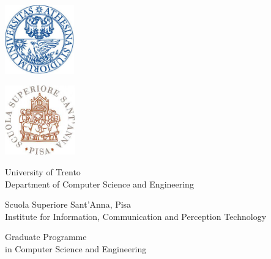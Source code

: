 \documentclass[11pt,a4paper,twoside,titlepage,openany]{book}
\begin{document}
\begin{titlepage}

  \begin{center}
    \noindent\begin{minipage}{.65\textwidth} 
      \begin{minipage}{0.5\textwidth}
        \centering
        \includegraphics[height=3cm]{img/logo_unitn_blu.jpg}  %
      \end{minipage}%
      \begin{minipage}{0.5\textwidth}
        \centering 
        \includegraphics[height=3cm]{img/logo_santanna.jpg}
      \end{minipage} 
    \end{minipage}
    \vspace{1cm}

    \LARGE{University of Trento}\\
    \Large{Department of Computer Science and Engineering}

    \vspace{.5cm}

    \LARGE{Scuola Superiore Sant'Anna, Pisa}\\
    \Large{Institute for Information, Communication and Perception Technology}

    \vspace{1cm} 
    \LARGE{Graduate Programme\\
      in Computer Science and Engineering
    }


\end{center}
\end{titlepage}
\end{document}
